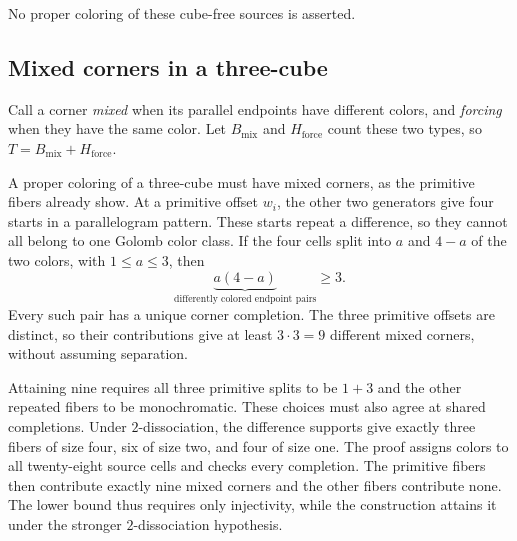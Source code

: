 \documentclass[11pt,a4paper]{article}
\newif\ifshowrevisions
\newenvironment{revision}{\par\begingroup\ifshowrevisions\color{red}\fi}{\par\endgroup}
\theoremstyle{definition}
\newcommand{\mix}{B_{\mathrm{mix}}}
\newcommand{\force}{H_{\mathrm{force}}}
\numberwithin{equation}{section}
\begin{document}
No proper coloring of these cube-free sources is asserted.

\subsection{Mixed corners in a three-cube}
Call a corner \emph{mixed} when its parallel endpoints have different
colors, and \emph{forcing} when they have the same color.
Let $\mix$ and $\force$ count these two types, so $T=\mix+\force$.

\begin{revision}
A proper coloring of a three-cube must have mixed corners, as the
primitive fibers already show. At a primitive offset $w_i$, the other two generators give
four starts in a parallelogram pattern. These starts repeat a difference,
so they cannot all belong to one Golomb color class. If the four cells
split into $a$ and $4-a$ of the two colors, with $1\le a\le3$, then
\[
\underbrace{a(4-a)}_{\text{differently colored endpoint pairs}}
\ge3.
\]
Every such pair has a unique corner completion. The three primitive
offsets are distinct, so their contributions give at least $3\cdot3=9$
different mixed corners, without assuming separation.

Attaining nine requires all three primitive splits to be $1+3$ and the
other repeated fibers to be monochromatic. These choices must also agree
at shared completions. Under $2$-dissociation,
the difference supports give exactly three fibers of size four, six of
size two, and four of size one. The proof assigns colors to all twenty-eight source cells and checks
every completion. The primitive
fibers then contribute exactly nine mixed corners and the other fibers
contribute none. The lower bound thus requires only injectivity, while the construction
attains it under the stronger $2$-dissociation hypothesis.
\end{revision}
\end{document}

